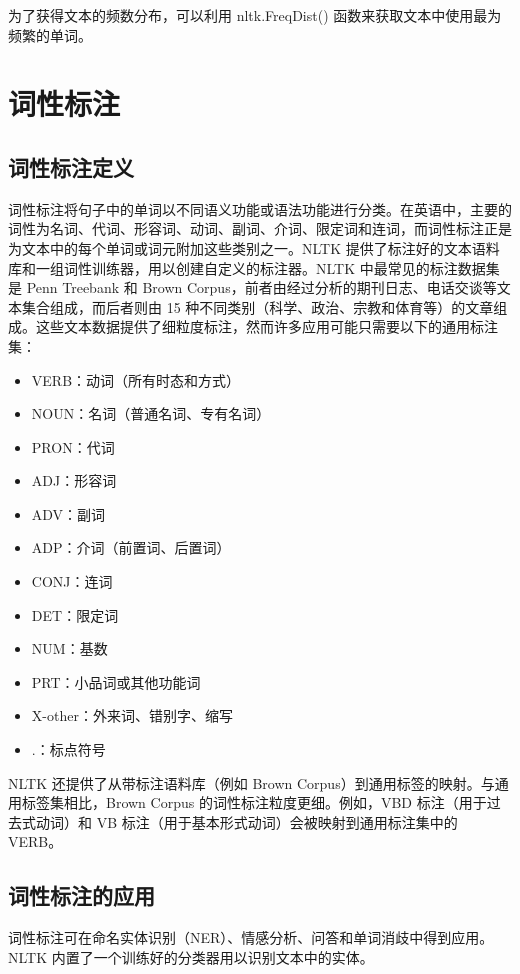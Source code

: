 为了获得文本的频数分布，可以利用 nltk.FreqDist() 函数来获取文本中使用最为频繁的单词。
\section{词性标注}
\subsection{词性标注定义}
词性标注将句子中的单词以不同语义功能或语法功能进行分类。在英语中，主要的词性为名词、代词、形容词、动词、副词、介词、限定词和连词，而词性标注正是为文本中的每个单词或词元附加这些类别之一。NLTK 提供了标注好的文本语料库和一组词性训练器，用以创建自定义的标注器。NLTK 中最常见的标注数据集是 Penn Treebank 和 Brown Corpus，前者由经过分析的期刊日志、电话交谈等文本集合组成，而后者则由 15 种不同类别（科学、政治、宗教和体育等）的文章组成。这些文本数据提供了细粒度标注，然而许多应用可能只需要以下的通用标注集：
\begin{itemize}
    \item VERB：动词（所有时态和方式）
    \item NOUN：名词（普通名词、专有名词）
    \item PRON：代词
    \item ADJ：形容词
    \item ADV：副词
    \item ADP：介词（前置词、后置词）
    \item CONJ：连词
    \item DET：限定词
    \item NUM：基数
    \item PRT：小品词或其他功能词
    \item X-other：外来词、错别字、缩写
    \item .：标点符号
\end{itemize}
NLTK 还提供了从带标注语料库（例如 Brown Corpus）到通用标签的映射。与通用标签集相比，Brown Corpus 的词性标注粒度更细。例如，VBD 标注（用于过去式动词）和 VB 标注（用于基本形式动词）会被映射到通用标注集中的 VERB。
\subsection{词性标注的应用}
词性标注可在命名实体识别（NER）、情感分析、问答和单词消歧中得到应用。NLTK 内置了一个训练好的分类器用以识别文本中的实体。
